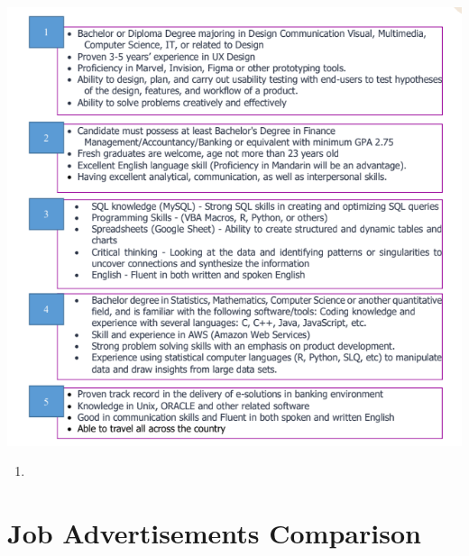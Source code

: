 \documentclass[12pt,titlepage]{article}
\begin{document}
\begin{center}
    \includegraphics*[width=.9\textwidth]{./images/jobdesc.png}
\end{center}

\begin{enumerate}
    \item 
\end{enumerate}

\pagebreak

\section{Job Advertisements Comparison}
\end{document}
